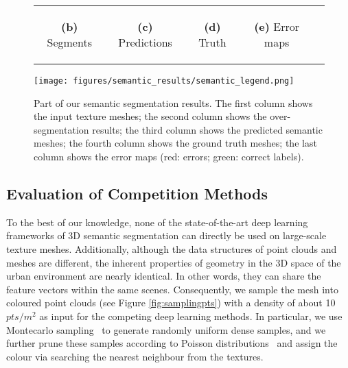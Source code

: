 \begin{figure}[H]
\begin{adjustwidth}{-3cm}{-3cm}
\begin{tabular}{ccccc}
			\begin{footnotesize} \textbf{(b)} Segments \end{footnotesize}&
			\begin{footnotesize} \textbf{(c)} Predictions \end{footnotesize}&
			\begin{footnotesize} \textbf{(d)} Truth \end{footnotesize}&
			\begin{footnotesize} \textbf{(e)} Error maps \end{footnotesize}
			\\	
		\end{tabular}
	\end{adjustwidth}
	\centering
	\texttt{[image: figures/semantic\_results/semantic\_legend.png]}
	\caption{Part of our semantic segmentation results. 
		The first column shows the input texture meshes; 
		the second column shows the over-segmentation results; 
		the third column shows the predicted semantic meshes; 
		the fourth column shows the ground truth meshes; 
		the last column shows the error maps (red: errors; green: correct labels).}
	\label{fig:semantic_qualitive}
\end{figure}

\subsection{Evaluation of Competition Methods}
To the best of our knowledge, none of the state-of-the-art deep learning frameworks of 3D semantic segmentation can directly be used on large-scale texture meshes.
Additionally, although the data structures of point clouds and meshes are different, the inherent properties of geometry in the 3D space of the urban environment are nearly identical.
In other words, they can share the feature vectors within the same scenes.
Consequently, we sample the mesh into coloured point clouds (see Figure \ref{fig:samplingpts}) with a density of about 10 $pts/m^2$ as input for the competing deep learning methods.
In particular, we use Montecarlo sampling~\citep{cignoni1998metro} to generate randomly uniform dense samples, and we further prune these samples according to Poisson distributions~\citep{corsini2012efficient} and assign the colour via searching the nearest neighbour from the textures.

